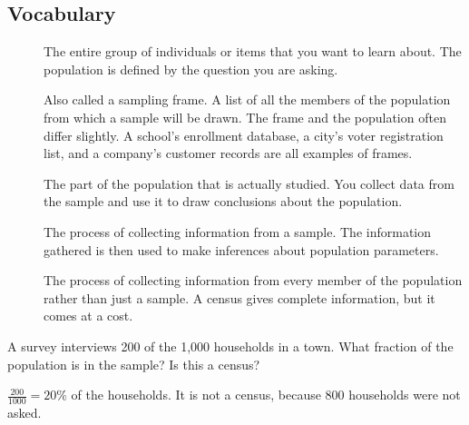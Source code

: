 \subsection{Vocabulary}

\begin{description}
    \item[] The entire group of individuals or items that 
    you want to learn about. The population is defined by the question you are asking.

    \item[] Also called a sampling frame. A list of all the members 
    of the population from which a sample will be drawn. The frame and the population often differ slightly. A school's enrollment database, a city's voter registration list, and a company's customer records are all examples of frames.

    \item[] The part of the population that is actually studied. 
    You collect data from the sample and use it to draw conclusions about the population.

    \item[] The process of collecting information from a 
    sample. The information gathered is then used to make inferences about population parameters.

    \item[] The process of collecting information from every member of the population 
    rather than just a sample. A census gives complete information, but it comes at a cost.
\end{description}

\begin{Worked}
\begin{Problem}
A survey interviews 200 of the 1,000 households in a
town. What fraction of the population is in the sample? Is this a census?
\end{Problem}
\begin{Solution}
$\frac{200}{1000} = 20\%$ of the households. It is not a
census, because 800 households were not asked.
\end{Solution}
\end{Worked}

